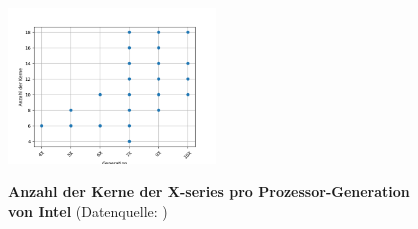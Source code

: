 \documentclass[sigconf,language=ngerman]{acmart}
\begin{document}
\begin{figure}[ht]
\hspace{-0.6cm}
\caption{\textbf{Anzahl der Kerne der X-series pro Prozessor-Generation von Intel} (Datenquelle: \cite{Comparison})}
\includegraphics[width=0.49\textwidth]{Abbildung_2.png}
\label{fig:Abbildung_2} 
\end{figure}
\end{document}
